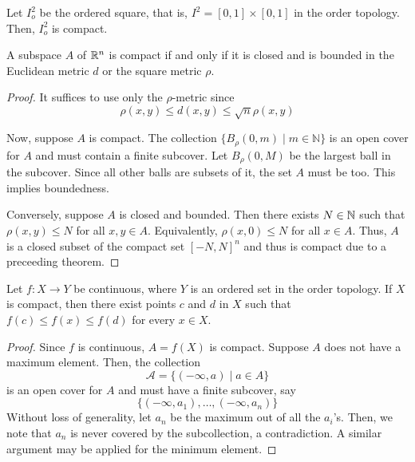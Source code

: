 \begin{corollary}
    Let $I_o^2$ be the ordered square, that is, $I^2 = [0,1]\times[0,1]$ in the order topology. Then, $I_o^2$ is compact.
\end{corollary}

\begin{theorem}
    A subspace $A$ of $\mathbb{R}^n$ is compact if and only if it is closed and is bounded in the Euclidean metric $d$ or the square metric $\rho$.
\end{theorem}
\begin{proof}
    It suffices to use only the $\rho$-metric since 
    \begin{equation*}
        \rho(x,y)\le d(x,y)\le\sqrt{n}\rho(x,y)
    \end{equation*}

    Now, suppose $A$ is compact. The collection $\{B_\rho(0, m)\mid m\in\mathbb{N}\}$ is an open cover for $A$ and must contain a finite subcover. Let $B_\rho(0, M)$ be the largest ball in the subcover. Since all other balls are subsets of it, the set $A$ must be too. This implies boundedness.

    Conversely, suppose $A$ is closed and bounded. Then there exists $N\in\mathbb{N}$ such that $\rho(x,y)\le N$ for all $x,y\in A$. Equivalently, $\rho(x,0)\le N$ for all $x\in A$. Thus, $A$ is a closed subset of the compact set $[-N, N]^n$ and thus is compact due to a preceeding theorem.
\end{proof}

\begin{theorem}
    Let $f:X\to Y$ be continuous, where $Y$ is an ordered set in the order topology. If $X$ is compact, then there exist points $c$ and $d$ in $X$ such that $f(c)\le f(x)\le f(d)$ for every $x\in X$.
\end{theorem}
\begin{proof}
    Since $f$ is continuous, $A = f(X)$ is compact. Suppose $A$ does not have a maximum element. Then, the collection 
    \begin{equation*}
        \mathscr{A} = \{(-\infty, a)\mid a\in A\}
    \end{equation*}
    is an open cover for $A$ and must have a finite subcover, say 
    \begin{equation*}
        \{(-\infty, a_1),\ldots,(-\infty, a_n)\}
    \end{equation*}
    Without loss of generality, let $a_n$ be the maximum out of all the $a_i$'s. Then, we note that $a_n$ is never covered by the subcollection, a contradiction. A similar argument may be applied for the minimum element.
\end{proof}

